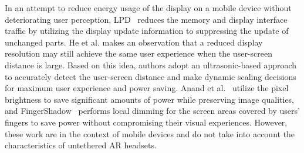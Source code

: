 In an attempt to reduce energy usage of the display on a mobile device without
deteriorating user perception,
%
LPD~\cite{191579} reduces the memory and display interface traffic by 
utilizing the display update information to 
suppressing the update of unchanged parts.
%
He et al. \cite{He:2015:OSP} makes an observation that 
a reduced display resolution may still achieve the same user experience
when the user-screen distance is large. Based on this idea, 
authors adopt an ultrasonic-based approach to accurately detect the user-screen
distance and make dynamic scaling decisions for maximum user experience and 
power saving.
%
Anand et al.~\cite{Anand:2011} utilize the pixel brightness to 
save significant amounts of power while preserving image qualities, and
%
FingerShadow~\cite{187123} performs local dimming for the screen areas covered
by users' fingers to save power without compromising their visual experiences.
%
%
However, these work are in the context of mobile devices and do not take into
account the characteristics of untethered AR headsets.
%

